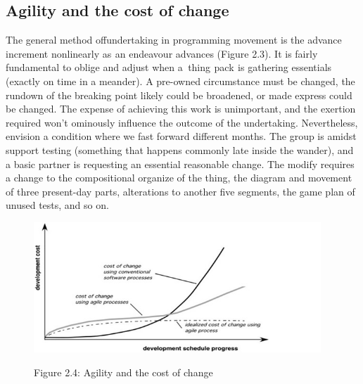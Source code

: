 \documentclass[oneside,12pt]{Classes/VTU}
\begin{document}
    	\subsection{Agility and the cost of change}
    	The general method of\tiny\textcolor{white}{f}\normalsize undertaking in programming movement is the advance increment nonlinearly as\tiny\textcolor{white}{s}\normalsize an endeavour advances (Figure 2.3). It is fairly fundamental to oblige and adjust when a\tiny\textcolor{white}{n}\normalsize thing\tiny\textcolor{white}{s}\normalsize pack\tiny\textcolor{white}{s}\normalsize is gathering essentials (exactly on time in a meander). A pre-owned circumstance must be changed, the rundown of the breaking point likely could be broadened, or made express could be changed. The expense of achieving this work is unimportant, and the exertion required won't ominously influence the outcome of the undertaking. Nevertheless, envision a condition where we fast forward different months. The group is amidst support testing (something that happens commonly late inside the wander), and a basic partner is requesting an essential reasonable change. The modify requires a change to the compositional organize of the thing, the diagram and movement of three present-day parts, alterations to another five segments, the game plan of unused tests, and so on.
    	
    	
    	\begin{figure}
    		\begin{center}
    			\includegraphics[scale=0.7]{images/chotu.png}
    		\end{center}
    		
    		
    		\begin{center}
    				Figure 2.4: Agility and the cost of change
    		\end{center}
    	\end{figure}
\end{document}
